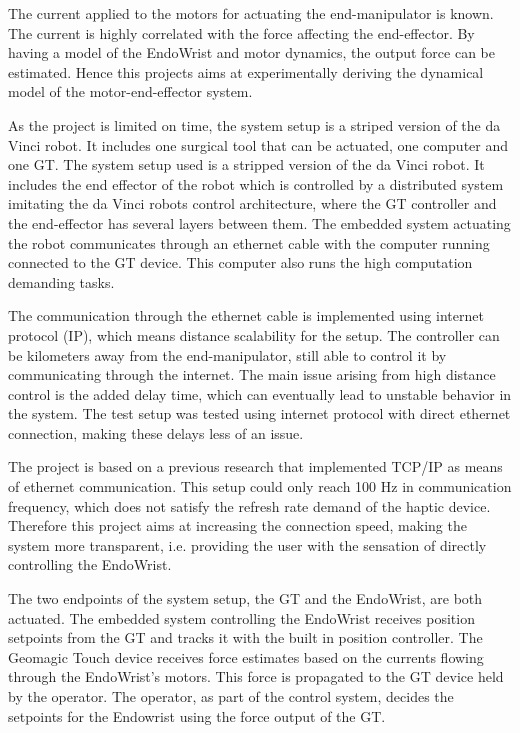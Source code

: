 {\color{red}
The current applied to the motors for actuating the end-manipulator is known. The current is highly correlated with the force affecting the end-effector. By having a model of the EndoWrist and motor dynamics, the output force can be estimated. Hence this projects aims at experimentally deriving the dynamical model of the motor-end-effector system.}

As the project is limited on time, the system setup is a striped version of the da Vinci robot. It includes one surgical tool that can be actuated, one computer and one GT. 
{\color{red}The system setup used is a stripped version of the da Vinci robot.
It includes the end effector of the robot which is controlled by a distributed system imitating the da Vinci robots control architecture, where the GT controller and the end-effector has several layers between them. The embedded system actuating the robot communicates through an ethernet cable with the computer running connected to the GT device. This computer also runs the high computation demanding tasks.}


{\color{red}The communication through the ethernet cable is implemented using internet protocol (IP), which means distance scalability for the setup. The controller can be kilometers away from the end-manipulator, still able to control it by communicating through the internet.} {\color{yellow} The main issue arising from high distance control is the added delay time, which can eventually lead to unstable behavior in the system. The test setup was tested using internet protocol with direct ethernet connection, making these delays less of an issue.}

{\color{red}
The project is based on a previous research that implemented TCP/IP as means of ethernet communication. This setup could only reach 100 Hz in communication frequency, which does not satisfy the refresh rate demand of the haptic device\cite{Chris_Surgical}\cite{coles2011role}. Therefore this project aims at increasing the connection speed, making the system more transparent, i.e. providing the user with the sensation of directly controlling the EndoWrist.} 

{\color{red}
The two endpoints of the system setup, the GT and the EndoWrist, are both actuated. The embedded system controlling the EndoWrist receives position setpoints from the GT and tracks it with the built in position controller.
The Geomagic Touch device receives force estimates based on the currents flowing through the EndoWrist's motors. This force is propagated to the GT device held by the operator. The operator, as part of the control system, decides the setpoints for the Endowrist using the force output of the GT.}%

